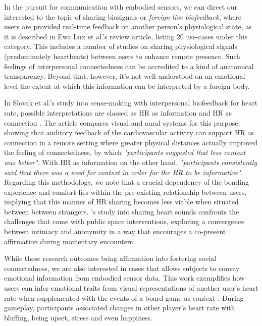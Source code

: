 In the pursuit for communication with embodied sensors, we can direct our interested to the topic of sharing biosignals or \textit{foreign live biofeedback}, where users are provided real-time feedback on another person's physiological state, as it is described in Ewa Lux et al.'s \cite{lux_live_2018} review article, listing 20 use-cases under this category. This includes a number of studies on sharing physiological signals (predominately heartbeats) between users to enhance remote presence. Such feelings of interpersonal connectedness can be accredited to a kind of anatomical transparency. Beyond that, however, it's not well understood on an emotional level the extent at which this information can be interpreted by a foreign body.

In Slovak et al.'s study into sense-making with interpersonal biofeedback for heart rate, possible interpretations are classed as HR as information and HR as connection \cite{slovak_understanding_2012}. The article compares visual and aural systems for this purpose, showing that auditory feedback of the cardiovascular activity can support HR as connection in a remote setting where greater physical distances actually improved the feeling of connectedness, by which \textit{"participants suggested that less context was better"}. With HR as information on the other hand, \textit{"participants consistently said that there was a need for context in order for the HR to be informative"}. Regarding this methodology, we note that a crucial dependency of the bonding experience and comfort lies within the pre-existing relationship between users, implying that this manner of HR sharing becomes less viable when situated between between strangers. \citeauthor{howell_life-affirming_2019}'s study into sharing heart sounds confronts the challenges that come with public space interventions, exploring a convergence between intimacy and anonymity in a way that encourages a co-present affirmation during momentary encounters \cite{howell_life-affirming_2019}.

While these research outcomes bring affirmation into fostering social connectedness, we are also interested in cases that allows subjects to convey emotional information from embodied sensor data. This work exemplifies how users can infer emotional traits from visual representations of another user's heart rate when supplemented with the events of a board game as context \cite{frey_remote_2016}. During gameplay, participants associated changes in other player's heart rate with bluffing, being upset, stress and even happiness.

